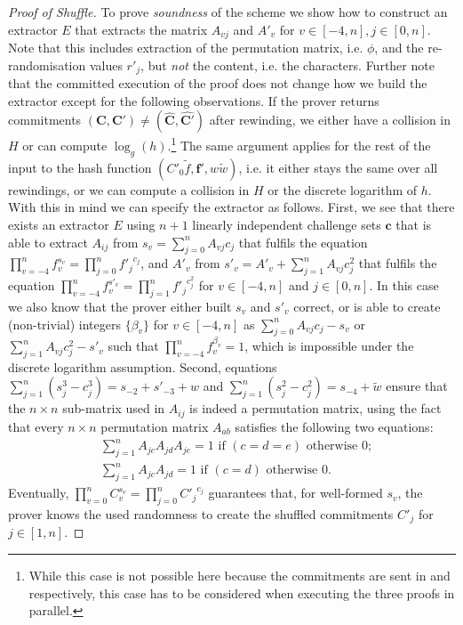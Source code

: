 \begin{proof}[Proof of Shuffle]
To prove \emph{soundness} of the \PoS scheme we show how to construct an extractor $E$ that extracts the matrix $A_{vj}$ and $A'_v$ for $v\in[-4,n], j\in[0,n]$.
Note that this includes extraction of the permutation matrix, i.e. $\phi$, and the re-randomisation values $r'_j$, but \emph{not} the content, i.e. the characters.
Further note that the committed execution of the proof does not change how we build the extractor except for the following observations.
If the prover returns commitments $(\bm C, \bm C')\not=(\hat{\bm C}, \hat{\bm C'})$ after rewinding, we either have a collision in $H$ or can compute $\log_g(h)$.\footnote{While this case is not possible here because the commitments are sent in \PoS and \PoC respectively, this case has to be considered when executing the three proofs in parallel.}
The same argument applies for the rest of the input to the hash function $(C'_0 \tilde{f}, \bm f', w \tilde{w})$, i.e. it either stays the same over all rewindings, or we can compute a collision in $H$ or the discrete logarithm of $h$.
With this in mind we can specify the extractor as follows.
First, we see that there exists an extractor $E$ using $n+1$ linearly independent challenge sets $\bm c$ that is able to extract $A_{ij}$ from $s_v=\sum_{j=0}^n A_{vj}c_j$ that fulfils the equation $\prod_{v=-4}^n f_v^{s_v}=\prod_{j=0}^n {f'_j}^{c_j}$, and $A'_v$ from $s'_v=A'_v + \sum_{j=1}^n A_{vj}c_j^2$ that fulfils the equation $\prod_{v=-4}^n f_v^{s'_v}=\prod_{j=1}^n {f'_j}^{c^2_j}$ for $v\in[-4,n]$ and $j\in[0,n]$.
In this case we also know that the prover either built $s_v$ and $s'_v$ correct, or is able to create (non-trivial) integers $\{\beta_v\}$ for $v\in[-4,n]$ as $\sum_{j=0}^n A_{vj}c_j - s_v$ or $\sum_{j=1}^n A_{vj}c^2_j - s'_v$ such that $\prod_{v=-4}^n f_v^{\beta_v} = 1$, which is impossible under the discrete logarithm assumption.
Second, equations $\sum_{j=1}^n (s_j^3 - c_j^3)=s_{-2} + s'_{-3} + w$ and $\sum_{j=1}^n (s_j^2 - c_j^2)= s_{-4} + \tilde{w}$ ensure that the $n\times n$ sub-matrix used in $A_{ij}$ is indeed a permutation matrix, using the fact that every $n\times n$ permutation matrix $A_{ab}$ satisfies the following two equations:
\begin{align*}
  & \sum_{j=1}^n A_{jc} A_{jd} A_{je} = 1 \text{ if } (c=d=e) \text{ otherwise } 0; \\  
  & \sum_{j=1}^n A_{jc} A_{jd} = 1 \text{ if } (c=d) \text{ otherwise } 0.
\end{align*}
Eventually, $\prod_{v=0}^n C_v^{s_v}=\prod_{j=0}^n {C'_j}^{c_j}$ guarantees that, for well-formed $s_v$, the prover knows the used randomness to create the shuffled commitments $C'_j$ for $j\in[1,n]$.
\end{proof}

